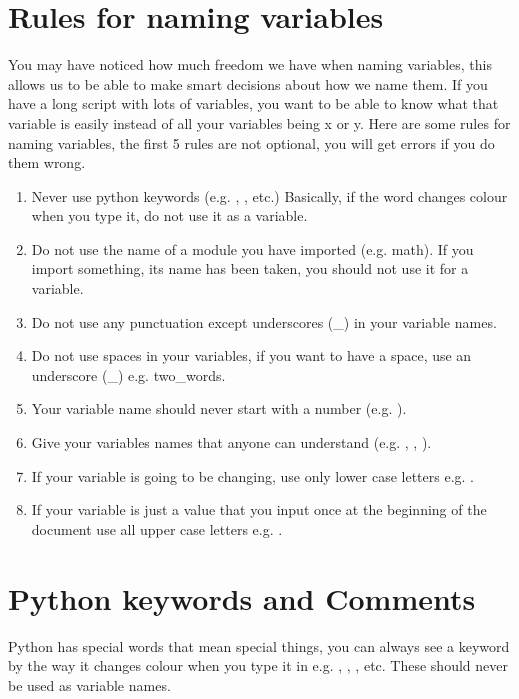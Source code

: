 \section{Rules for naming variables}

You may have noticed how much freedom we have when naming variables, this allows us to be able to make smart decisions about how we name them. If you have a long script with lots of variables, you want to be able to know what that variable is easily instead of all your variables being x or y. Here are some rules for naming variables, the first 5 rules are not optional, you will get errors if you do them wrong.

\begin{enumerate}
\item Never use python keywords (e.g. , ,  etc.) Basically, if the word changes colour when you type it, do not use it as a variable.
\item Do not use the name of a module you have imported (e.g. math). If you import something, its name has been taken, you should not use it for a variable.
\item Do not use any punctuation except underscores ({\_}) in your variable names.
\item Do not use spaces in your variables, if you want to have a space, use an underscore ({\_}) e.g. two{\_}words.
\item Your variable name should never start with a number (e.g. ).
\item Give your variables names that anyone can understand (e.g. , , ).
\item If your variable is going to be changing, use only lower case letters e.g. .
\item If your variable is just a value that you input once at the beginning of the document use all upper case letters e.g. .
\end{enumerate}

\section{Python keywords and Comments}

Python has special words that mean special things, you can always see a keyword by the way it changes colour when you type it in e.g. , , ,  etc. These should never be used as variable names.


